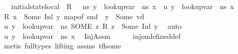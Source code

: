 \begin{isabellebody}
\ \ \ {\isachardoublequoteopen}initial{\isacharunderscore}{\kern0pt}state{\isacharunderscore}{\kern0pt}local\ {\isasymOmega}\ R\ {\isasymLambda}\ {\isasymLambda}{\isacharprime}{\kern0pt}\ ns\ y\ {\isacharequal}{\kern0pt}\ lookup{\isacharunderscore}{\kern0pt}var\ {\isasymLambda}\ ns\ x{\isachardoublequoteclose}\ {\isacharparenleft}{\kern0pt}\ {\isachardoublequoteopen}{\isacharquery}{\kern0pt}u\ y\ {\isacharequal}{\kern0pt}\ lookup{\isacharunderscore}{\kern0pt}var\ {\isasymLambda}\ ns\ x{\isachardoublequoteclose}{\isacharparenright}{\kern0pt}\isanewline
%
\isadelimproof
%
\endisadelimproof
%
\isatagproof
{}\isamarkupfalse%
\ {\isacharminus}{\kern0pt}\isanewline
\ \ \isamarkupfalse%
\ {\isacartoucheopen}R\ x\ {\isacharequal}{\kern0pt}\ Some\ {\isacharparenleft}{\kern0pt}Inl\ y{\isacharparenright}{\kern0pt}{\isacartoucheclose}\ {\isacartoucheopen}map{\isacharunderscore}{\kern0pt}of\ {\isacharparenleft}{\kern0pt}snd\ {\isasymLambda}{\isacharprime}{\kern0pt}{\isacharparenright}{\kern0pt}\ y\ {\isacharequal}{\kern0pt}\ Some\ vd{\isacartoucheclose}\ \isamarkupfalse%
\ {\isachardoublequoteopen}{\isacharquery}{\kern0pt}u\ y\ {\isacharequal}{\kern0pt}\ {\isacharparenleft}{\kern0pt}lookup{\isacharunderscore}{\kern0pt}var\ {\isasymLambda}\ ns\ {\isacharparenleft}{\kern0pt}SOME\ z{\isachardot}{\kern0pt}\ R\ z\ {\isacharequal}{\kern0pt}\ Some\ {\isacharparenleft}{\kern0pt}Inl\ y{\isacharparenright}{\kern0pt}{\isacharparenright}{\kern0pt}{\isacharparenright}{\kern0pt}{\isachardoublequoteclose}\ \isamarkupfalse%
\ auto\isanewline
\ \ \isamarkupfalse%
\ {\isachardoublequoteopen}{\isacharquery}{\kern0pt}u\ y\ {\isacharequal}{\kern0pt}\ lookup{\isacharunderscore}{\kern0pt}var\ {\isasymLambda}\ ns\ x{\isachardoublequoteclose}\ \isamarkupfalse%
\ InjAssm\isanewline
\ \ \ \ \isamarkupfalse%
\ inj{\isacharunderscore}{\kern0pt}on{\isacharunderscore}{\kern0pt}defined{\isacharunderscore}{\kern0pt}def\isanewline
\ \ \ \ \isamarkupfalse%
\ {\isacharparenleft}{\kern0pt}metis\ {\isacharparenleft}{\kern0pt}full{\isacharunderscore}{\kern0pt}types{\isacharcomma}{\kern0pt}\ lifting{\isacharparenright}{\kern0pt}\ assms{\isacharparenleft}{\kern0pt}{}{\isacharparenright}{\kern0pt}\ tfl{\isacharunderscore}{\kern0pt}some{\isacharparenright}{\kern0pt}\ \ \ \ \ \ \ \isanewline
{}\isamarkupfalse%
%
\endisatagproof
{\isafoldproof}%
%
\isadelimproof
\isanewline
%
\endisadelimproof

\end{isabellebody}
